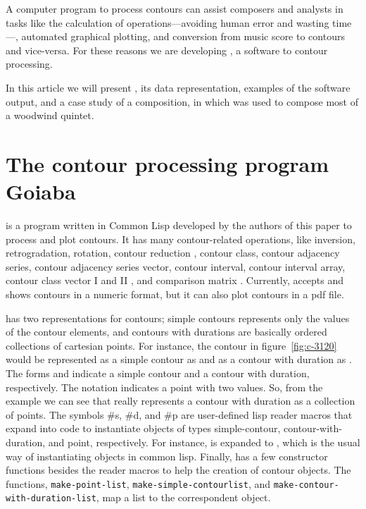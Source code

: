 \documentclass[a0paper]{sciposter}
\begin{document}
\begin{multicols}{3}
A computer program to process contours can assist composers and
analysts in tasks like the calculation of operations---avoiding human
error and wasting time---, automated graphical plotting, and
conversion from music score to contours and vice-versa. For these
reasons we are developing \goiaba{}, a software to contour processing.

In this article we will present \goiaba{}, its data representation,
examples of the software output, and a case study of a composition, in
which \goiaba{} was used to compose most of a woodwind quintet.

\section{The contour processing program Goiaba}

\goiaba{} is a program written in Common Lisp developed by the authors
of this paper to process and plot contours. It has many
contour-related operations, like inversion, retrogradation, rotation,
contour reduction \cite{adams76:melodic}, contour class, contour
adjacency series, contour adjacency series vector, contour interval,
contour interval array, contour class vector I and II
\cite{friedmann85:methodology}, and comparison matrix
\cite{morris93:directions}. Currently, \goiaba{} accepts and shows
contours in a numeric format, but it can also plot contours in a pdf
file.

\goiaba{} has two representations for contours; simple contours
represents only the values of the contour elements, and contours with
durations are basically ordered collections of cartesian points. For
instance, the contour in figure~\ref{fig:c-3120} would be represented
as a simple contour as  and as a contour with
duration as . The forms
 and  indicate a simple contour
and a contour with duration, respectively. The notation  indicates a point with two values. So, from the example we can
see that \goiaba{} really represents a contour with duration as a
collection of points. The symbols \#s, \#d, and \#p are user-defined
lisp reader macros that expand into code to instantiate objects of
types simple-contour, contour-with-duration, and point, respectively.
For instance,  is expanded to , which is the usual way of instantiating objects
in common lisp. Finally, \goiaba{} has a few constructor functions
besides the reader macros to help the creation of contour objects. The
functions, \texttt{make-point-list},
\texttt{make-sim\-ple-contour\-list}, and
\texttt{make-contour-with-du\-ra\-tion-list}, map a list to the
correspondent object.


\end{multicols}
\end{document}
